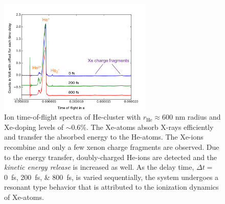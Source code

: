 \begin{figure}
	\centering
		\includegraphics[width=0.65\textwidth]{images/results/TOF-helium-xenon-cluster-60.png}
	\caption[TOF spectra of HeXe-clusters with $\sim 0.6\%$ Xe-doping at various delays $\Delta t$.]{Ion time-of-flight spectra of He-cluster with $r_{\text{He}}\approx 600$ nm radius and Xe-doping levels of $\sim 0.6\%$. The Xe-atoms absorb X-rays efficiently and transfer the absorbed energy to the He-atoms. The Xe-ions recombine and only a few xenon charge fragments are observed. Due to the energy transfer, doubly-charged He-ions are detected and the \textit{kinetic energy release} is increased as well. As the delay time, $\Delta t=$ \SIlist{0;200;800}{\femto\second}, is varied sequentially, the system undergoes a resonant type behavior that is attributed to the ionization dynamics of Xe-atoms.}
	\label{fig:TOF-helium-xenon-cluster-60}
\end{figure}
